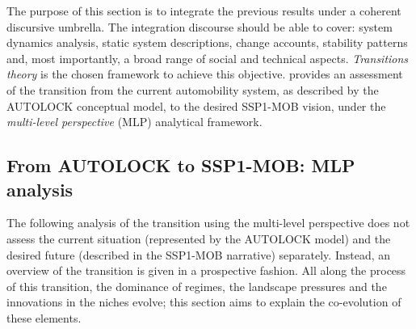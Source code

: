 %
%
%
The purpose of this section is to integrate the previous results under a coherent discursive umbrella. The integration discourse should be able to cover: system dynamics analysis, static system descriptions, change accounts, stability patterns and, most importantly, a broad range of social and technical aspects. \emph{Transitions theory} is the chosen framework to achieve this objective.  provides an assessment of the transition from the current automobility system, as described by the AUTOLOCK conceptual model, to the desired SSP1-MOB vision, under the \emph{multi-level perspective} (MLP) analytical framework.%

\subsection{From AUTOLOCK to SSP1-MOB: MLP analysis}
\label{ss:results:transition_mlp}
The following analysis of the transition using the multi-level perspective does not assess the current situation (represented by the AUTOLOCK model) and the desired future (described in the SSP1-MOB narrative) separately. Instead, an overview of the transition is given in a prospective fashion. All along the process of this transition, the dominance of regimes, the landscape pressures and the innovations in the niches evolve; this section aims to explain the co-evolution of these elements.

